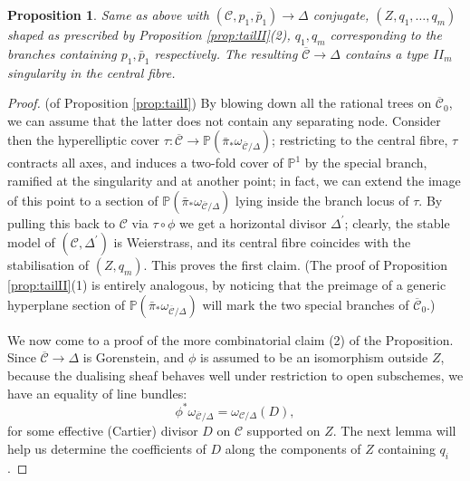 \documentclass[11pt]{amsart}
\newcommand{\PP}{\mathbb P}
\renewcommand{\to}{\rightarrow}
\newcommand{\dvr}{\Delta}
\theoremstyle{plain}
\newtheorem{prop}[thm]{Proposition}
\theoremstyle{definition}
\begin{document}
\begin{prop}\label{prop:contractionII}
 Same as above with $(\mathcal C,p_1,\bar p_1)\to \Delta$ conjugate, $(Z,q_1,\ldots,q_m)$ shaped as prescribed by Proposition \ref{prop:tailII}(2), $q_1,q_m$ corresponding to the branches containing $p_1,\bar p_1$ respectively. The resulting $\overline{\mathcal C}\to\dvr$ contains a type $I\!I_m$ singularity in the central fibre.
\end{prop}

\begin{proof}(of Proposition \ref{prop:tailI}) By blowing down all the rational trees on $\overline{\mathcal C}_0$, we can assume that the latter does not contain any separating node. Consider then the hyperelliptic cover $\tau\colon\overline{\mathcal C}\to\PP(\bar\pi_*\omega_{\overline{\mathcal C}/\dvr})$; restricting to the central fibre, $\tau$ contracts all axes, and induces a two-fold cover of $\PP^1$ by the special branch, ramified at the singularity and at another point; in fact, we can extend the image of this point to a section of $\PP(\bar\pi_*\omega_{\overline{\mathcal C}/\dvr})$ lying inside the branch locus of $\tau$. By pulling this back to $\mathcal C$ via $\tau\circ\phi$ we get a horizontal divisor $\Delta^\prime$; clearly, the stable model of $(\mathcal C,\Delta^\prime)$ is Weierstrass, and its central fibre coincides with the stabilisation of $(Z,q_m)$. This proves the first claim. (The proof of Proposition \ref{prop:tailII}(1) is entirely analogous, by noticing that the preimage of a generic hyperplane section of $\PP(\bar\pi_*\omega_{\overline{\mathcal C}/\dvr})$ will mark the two special branches of $\overline{\mathcal C}_0$.)

We now come to a proof of the more combinatorial claim (2) of the Proposition. Since $\overline{\mathcal C}\to \Delta$ is Gorenstein, and $\phi$ is assumed to be an isomorphism outside $Z$, because the dualising sheaf behaves well under restriction to open subschemes, we have an equality of line bundles:
\[ \phi^*\omega_{\overline{\mathcal C}/\dvr}=\omega_{\mathcal C/\dvr}(D),\]
for some effective (Cartier) divisor $D$ on $\mathcal C$ supported on $Z$. The next lemma will help us determine the coefficients of $D$ along the components of $Z$ containing $q_i$.


\end{proof}
\end{document}
